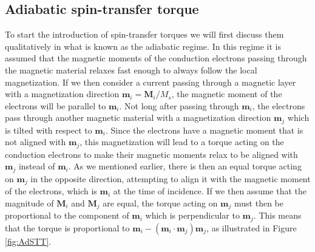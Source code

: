 \subsection{Adiabatic spin-transfer torque} \label{sec:AdSTT}
To start the introduction of spin-transfer torques we will first discuss them qualitatively in what is known as the adiabatic regime. In this regime it is assumed that the magnetic moments of the conduction electrons passing through the magnetic material relaxes fast enough to always follow the local magnetization. If we then consider a current passing through a magnetic layer with a magnetization direction $\mathbold{m}_i = \mathbold{M}_i/M_s$, the magnetic moment of the electrons will be parallel to $\mathbold{m}_i$. Not long after passing through $\mathbold{m}_i$, the electrons pass through another magnetic material with a magnetization direction $\mathbold{m}_j$ which is tilted with respect to $\mathbold{m}_i$. Since the electrons have a magnetic moment that is not aligned with $\mathbold{m}_j$, this magnetization will lead to a torque acting on the conduction electrons to make their magnetic moments relax to be aligned with $\mathbold{m}_j$ instead of $\mathbold{m}_i$. As we mentioned earlier, there is then an equal torque acting on $\mathbold{m}_j$ in the opposite direction, attempting to align it with the magnetic moment of the electrons, which is $\mathbold{m}_i$ at the time of incidence. If we then assume that the magnitude of $\mathbold{M}_i$ and $\mathbold{M}_j$ are equal, the torque acting on $\mathbold{m}_j$ must then be proportional to the component of $\mathbold{m}_i$ which is perpendicular to $\mathbold{m}_j$. This means that the torque is proportional to $\mathbold{m}_i-(\mathbold{m}_i\cdot\mathbold{m}_j)\mathbold{m}_j$, as illustrated in Figure \ref{fig:AdSTT}.

